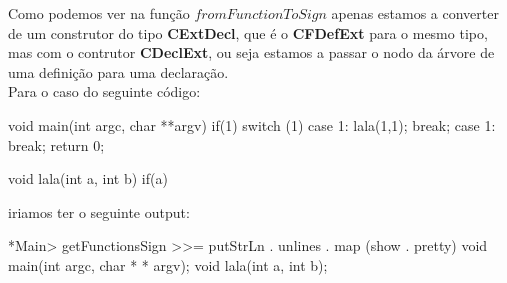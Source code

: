Como podemos ver na função $fromFunctionToSign$ apenas estamos a converter de um construtor do tipo \textbf{CExtDecl}, que é o \textbf{CFDefExt} para o mesmo tipo,
mas com o contrutor \textbf{CDeclExt}, ou seja estamos a passar o nodo da árvore de uma definição para uma declaração.\\

Para o caso do seguinte código:
\begin{code_files}
void main(int argc, char **argv) {    
    if(1) {}                                      
    switch (1) {                  
        case 1: {    
            lala(1,1);    
            break;                                 
        }    
        case 1: {                      
            break;    
        }                                                                         
    }                    
    return 0;    
}                                                                                         

void lala(int a, int b) {    
    if(a) {}    
}  
\end{code_files}
iriamos ter o seguinte output:
\begin{code_files}
*Main> getFunctionsSign >>= putStrLn . unlines . map (show . pretty)
void main(int argc, char * * argv);
void lala(int a, int b);
\end{code_files}
